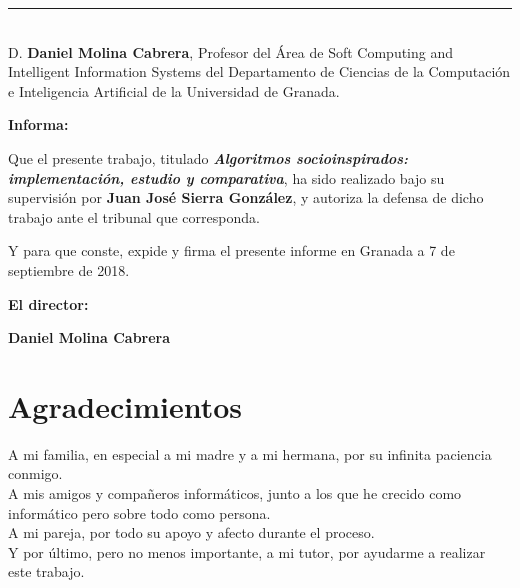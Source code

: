 \noindent\rule[-1ex]{\textwidth}{2pt}\\[4.5ex]

D. \textbf{Daniel Molina Cabrera}, Profesor del Área de Soft Computing and Intelligent Information Systems del Departamento de Ciencias de la Computación e Inteligencia Artificial de la Universidad de Granada.

\vspace{0.5cm}

\textbf{Informa:}

\vspace{0.5cm}

Que el presente trabajo, titulado \textit{\textbf{Algoritmos socioinspirados: implementación, estudio y comparativa}},
ha sido realizado bajo su supervisión por \textbf{Juan José Sierra González}, y autoriza la defensa de dicho trabajo ante el tribunal
que corresponda.

\vspace{0.5cm}

Y para que conste, expide y firma el presente informe en Granada a 7 de septiembre de 2018.

\vspace{1cm}

\textbf{El director:}

\vspace{5cm}

\noindent \textbf{Daniel Molina Cabrera}

\chapter*{Agradecimientos}
\thispagestyle{empty}

       \vspace{1cm}


A mi familia, en especial a mi madre y a mi hermana, por su infinita paciencia conmigo.\\

A mis amigos y compañeros informáticos, junto a los que he crecido como informático pero sobre todo como persona.\\

A mi pareja, por todo su apoyo y afecto durante el proceso.\\

Y por último, pero no menos importante, a mi tutor, por ayudarme a realizar este trabajo.\\
